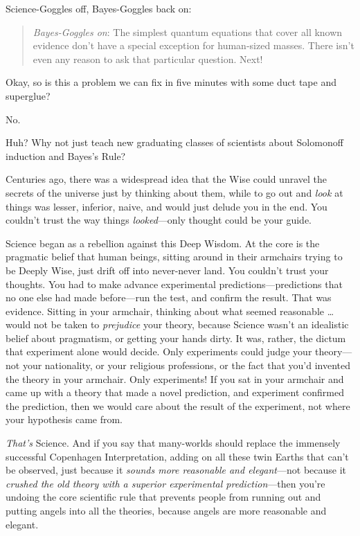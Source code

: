 {
 Science-Goggles off, Bayes-Goggles back on:}

\begin{quote}
{
 \textit{Bayes-Goggles on}: The simplest quantum equations that
cover all known evidence don't have a special exception
for human-sized masses. There isn't even any reason to
ask that particular question. Next!}
\end{quote}

{
 Okay, so is this a problem we can fix in five minutes with some
duct tape and superglue?}

{
 No.}

{
 Huh? Why not just teach new graduating classes of scientists about
Solomonoff induction and Bayes's Rule?}

{
 Centuries ago, there was a widespread idea that the Wise could
unravel the secrets of the universe just by thinking about them, while
to go out and \textit{look} at things was lesser, inferior, naive, and
would just delude you in the end. You couldn't trust
the way things \textit{looked}{}---only thought could be your guide.}

{
 Science began as a rebellion against this Deep Wisdom. At the core
is the pragmatic belief that human beings, sitting around in their
armchairs trying to be Deeply Wise, just drift off into never-never
land. You couldn't trust your thoughts. You had to make
advance experimental predictions---predictions that no one else had
made before---run the test, and confirm the result. That was evidence.
Sitting in your armchair, thinking about what seemed reasonable \ldots
would not be taken to \textit{prejudice} your theory, because Science
wasn't an idealistic belief about pragmatism, or
getting your hands dirty. It was, rather, the dictum that experiment
alone would decide. Only experiments could judge your theory---not your
nationality, or your religious professions, or the fact that
you'd invented the theory in your armchair. Only
experiments! If you sat in your armchair and came up with a theory that
made a novel prediction, and experiment confirmed the prediction, then
we would care about the result of the experiment, not where your
hypothesis came from.}

{
 \textit{That's} Science. And if you say that
many-worlds should replace the immensely successful Copenhagen
Interpretation, adding on all these twin Earths that
can't be observed, just because it \textit{sounds more
reasonable and elegant}{}---not because it \textit{crushed the old
theory with a superior experimental prediction}{}---then
you're undoing the core scientific rule that prevents
people from running out and putting angels into all the theories,
because angels are more reasonable and elegant.}

